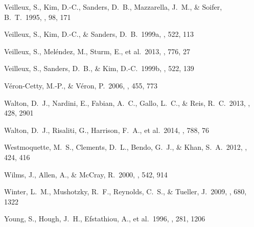 \documentclass[]{emulateapj}
\begin{document}
\begin{thebibliography}{}
 Veilleux, S., Kim, D.-C., Sanders, D.~B., Mazzarella, J.~M., \& Soifer, B.~T.\ 1995, \apjs, 98, 171 

Veilleux, S., Kim, D.-C., \& Sanders, D.~B.\ 1999a, \apj, 522, 113

Veilleux, S., Mel{\'e}ndez, M., Sturm, E., et al.\ 2013, \apj, 776, 27

Veilleux, S., Sanders, D.~B., \& Kim, D.-C.\ 1999b, \apj, 522, 139  

V{\'e}ron-Cetty, M.-P., \& V{\'e}ron, P.\ 2006, \aap, 455, 773 

Walton, D.~J., Nardini, E., Fabian, A.~C., Gallo, L.~C., \& Reis, R.~C.\ 2013, \mnras, 428, 2901 

Walton, D.~J., Risaliti, G., Harrison, F.~A., et al.\ 2014, \apj, 788, 76

Westmoquette, M.~S., Clements, D.~L., Bendo, G.~J., \& Khan, S.~A.\ 2012, \mnras, 424, 416 

 Wilms, J., Allen, A., \& McCray, R.\ 2000, \apj, 542, 914


Winter, L.~M., Mushotzky, R.~F., Reynolds, C.~S., \& Tueller, J.\ 2009, \apj, 680, 1322

Young, S., Hough, J.~H., Efstathiou, A., et al.\ 1996, \mnras, 281, 1206 

\end{thebibliography}
\end{document}
